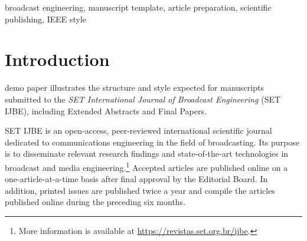 \documentclass[journal]{IEEEtran}
\begin{document}
\maketitle


\begin{abstract}
This document presents a demonstration paper for submissions to the \textit{SET International Journal of Broadcast Engineering} (SET IJBE). It provides authors with a practical example of the journal manuscript structure, including title, author information, abstract, keywords, sections, figures, tables, equations, lists, references, and acknowledgments. The sample text also explains the two submission paths available to contributors: direct submission to SET IJBE and submission through the annual SET Expo Congress R\&D Sessions. The content is intentionally generic and does not report original technical results; instead, it illustrates formatting conventions, writing organization, and the principal elements expected in a complete manuscript. This abstract is limited to fewer than 150 words, in accordance with the journal guidelines and intended to guide authors in preparing compliant, consistent, and publication-ready submissions. It may also be used as a reference when adapting the template to actual research articles.
\end{abstract}

\begin{IEEEkeywords}
broadcast engineering, manuscript template, article preparation, scientific publishing, IEEE style
\end{IEEEkeywords}

\section{Introduction}

 demo paper illustrates the structure and style expected for manuscripts submitted to the \textit{SET International Journal of Broadcast Engineering} (SET IJBE), including Extended Abstracts and Final Papers.

SET IJBE is an open-access, peer-reviewed international scientific journal dedicated to communications engineering in the field of broadcasting. Its purpose is to disseminate relevant research findings and state-of-the-art technologies in broadcast and media engineering.\footnote{More information is available at \url{https://revistas.set.org.br/ijbe}.} Accepted articles are published online on a one-article-at-a-time basis after final approval by the Editorial Board. In addition, printed issues are published twice a year and compile the articles published online during the preceding six months.
\end{document}
